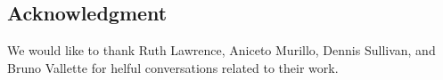 
\subsection*{Acknowledgment}

We would like to thank Ruth Lawrence, Aniceto Murillo, Dennis Sullivan, and Bruno Vallette for helful conversations related to their work.